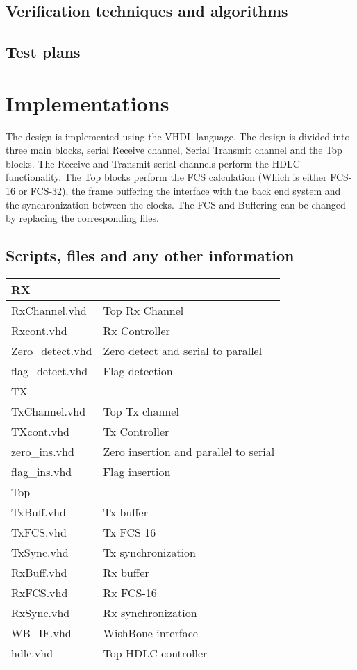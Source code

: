 \documentclass[a4paper,11pt]{article}
\begin{document}
\subsection{Verification techniques and algorithms}

\subsection{Test plans}

\section{Implementations}
The  design is implemented using the VHDL language. The design is divided into three main blocks, serial Receive channel, Serial Transmit channel and the Top blocks.
The Receive and Transmit serial channels perform the HDLC
functionality. The Top blocks perform the FCS calculation (Which is
either  FCS-16 or FCS-32), the frame buffering the interface with the
back end system and the synchronization between the clocks. The FCS and Buffering can be changed by replacing the corresponding files.

\subsection{Scripts, files and any other information}
\begin{tabular}{|l|l|}
\hline
RX & \\
\hline
RxChannel.vhd & Top Rx Channel \\
Rxcont.vhd & Rx Controller \\
Zero\_detect.vhd & Zero detect and serial to parallel \\
flag\_detect.vhd & Flag detection \\
\hline
TX & \\
\hline
TxChannel.vhd & Top Tx channel \\
TXcont.vhd & Tx Controller\\
zero\_ins.vhd  & Zero insertion and parallel to serial \\
flag\_ins.vhd & Flag insertion \\
\hline
Top & \\
\hline
TxBuff.vhd&  Tx buffer\\
TxFCS.vhd &  Tx FCS-16\\
TxSync.vhd & Tx synchronization\\
RxBuff.vhd&  Rx buffer\\
RxFCS.vhd &  Rx FCS-16\\
RxSync.vhd & Rx synchronization\\
WB\_IF.vhd & WishBone interface\\
hdlc.vhd  & Top HDLC controller\\
\hline
\end{tabular}
\end{document}
